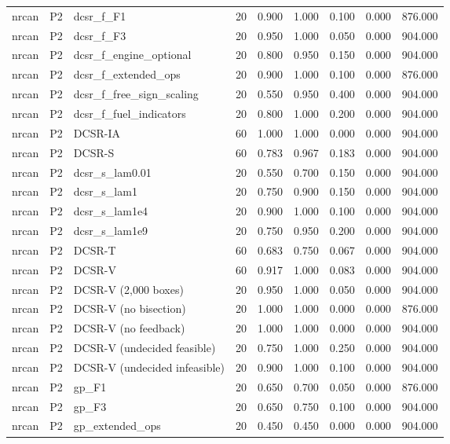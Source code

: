 \begin{tabular}{lllrrrrrr}
nrcan & P2 & dcsr\_f\_F1 & 20 & 0.900 & 1.000 & 0.100 & 0.000 & 876.000 \\
nrcan & P2 & dcsr\_f\_F3 & 20 & 0.950 & 1.000 & 0.050 & 0.000 & 904.000 \\
nrcan & P2 & dcsr\_f\_engine\_optional & 20 & 0.800 & 0.950 & 0.150 & 0.000 & 904.000 \\
nrcan & P2 & dcsr\_f\_extended\_ops & 20 & 0.900 & 1.000 & 0.100 & 0.000 & 876.000 \\
nrcan & P2 & dcsr\_f\_free\_sign\_scaling & 20 & 0.550 & 0.950 & 0.400 & 0.000 & 904.000 \\
nrcan & P2 & dcsr\_f\_fuel\_indicators & 20 & 0.800 & 1.000 & 0.200 & 0.000 & 904.000 \\
nrcan & P2 & DCSR-IA & 60 & 1.000 & 1.000 & 0.000 & 0.000 & 904.000 \\
nrcan & P2 & DCSR-S & 60 & 0.783 & 0.967 & 0.183 & 0.000 & 904.000 \\
nrcan & P2 & dcsr\_s\_lam0.01 & 20 & 0.550 & 0.700 & 0.150 & 0.000 & 904.000 \\
nrcan & P2 & dcsr\_s\_lam1 & 20 & 0.750 & 0.900 & 0.150 & 0.000 & 904.000 \\
nrcan & P2 & dcsr\_s\_lam1e4 & 20 & 0.900 & 1.000 & 0.100 & 0.000 & 904.000 \\
nrcan & P2 & dcsr\_s\_lam1e9 & 20 & 0.750 & 0.950 & 0.200 & 0.000 & 904.000 \\
nrcan & P2 & DCSR-T & 60 & 0.683 & 0.750 & 0.067 & 0.000 & 904.000 \\
nrcan & P2 & DCSR-V & 60 & 0.917 & 1.000 & 0.083 & 0.000 & 904.000 \\
nrcan & P2 & DCSR-V (2,000 boxes) & 20 & 0.950 & 1.000 & 0.050 & 0.000 & 904.000 \\
nrcan & P2 & DCSR-V (no bisection) & 20 & 1.000 & 1.000 & 0.000 & 0.000 & 876.000 \\
nrcan & P2 & DCSR-V (no feedback) & 20 & 1.000 & 1.000 & 0.000 & 0.000 & 904.000 \\
nrcan & P2 & DCSR-V (undecided feasible) & 20 & 0.750 & 1.000 & 0.250 & 0.000 & 904.000 \\
nrcan & P2 & DCSR-V (undecided infeasible) & 20 & 0.900 & 1.000 & 0.100 & 0.000 & 904.000 \\
nrcan & P2 & gp\_F1 & 20 & 0.650 & 0.700 & 0.050 & 0.000 & 876.000 \\
nrcan & P2 & gp\_F3 & 20 & 0.650 & 0.750 & 0.100 & 0.000 & 904.000 \\
nrcan & P2 & gp\_extended\_ops & 20 & 0.450 & 0.450 & 0.000 & 0.000 & 904.000 \\

\end{tabular}

